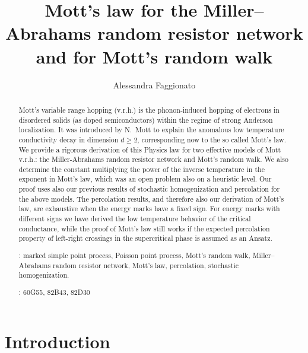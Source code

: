 \documentclass[12pt,a4paper,reqno]{amsart}
\author[A.~Faggionato]{Alessandra Faggionato}
\title[Mott's  law]{Mott's law for the  Miller--Abrahams random resistor network and for  Mott's random walk}
\begin{document}
\begin{abstract}
  Mott's  variable range hopping (v.r.h.) is  the phonon-induced hopping of electrons in disordered solids (as doped semiconductors) within the regime of strong Anderson localization. It was introduced by N.~Mott  to explain the anomalous low temperature conductivity decay in dimension $d\geq 2$, corresponding  now to the  so called Mott's law. We provide a rigorous derivation of this Physics law for two effective models of Mott v.r.h.: the Miller-Abrahams random resistor network and Mott's random walk. We also determine the  constant multiplying the power of the inverse temperature in the exponent in Mott's law, which was an open problem also on a  heuristic level.  Our proof uses also our previous results of stochastic homogenization and percolation for the above models. The percolation  results, and therefore also our derivation of Mott's law, are exhaustive      when the energy marks have a fixed sign. For  energy marks with different signs we have derived  the low temperature  behavior of the critical conductance, while the proof of Mott's law  still works if    the expected percolation property of left-right crossings in the supercritical phase   is assumed as an Ansatz.


\smallskip

: marked simple point process, 
Poisson point process,    Mott's random walk,  Miller--Abrahams random resistor network, Mott's law, percolation, stochastic homogenization. 

\smallskip

: 
60G55, %
82B43, %
82D30 %




\end{abstract}


\maketitle



\section{Introduction} 
\end{document}

